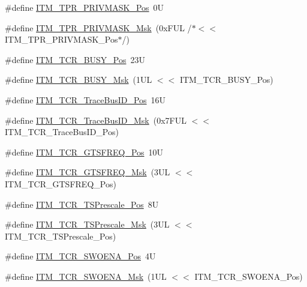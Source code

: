 \begin{DoxyCompactItemize}
\#define \hyperlink{group___c_m_s_i_s___i_t_m_ga7abe5e590d1611599df87a1884a352e8}{I\+T\+M\+\_\+\+T\+P\+R\+\_\+\+P\+R\+I\+V\+M\+A\+S\+K\+\_\+\+Pos}~0U
\item 
\#define \hyperlink{group___c_m_s_i_s___i_t_m_ga168e089d882df325a387aab3a802a46b}{I\+T\+M\+\_\+\+T\+P\+R\+\_\+\+P\+R\+I\+V\+M\+A\+S\+K\+\_\+\+Msk}~(0x\+F\+U\+L /$\ast$$<$$<$ I\+T\+M\+\_\+\+T\+P\+R\+\_\+\+P\+R\+I\+V\+M\+A\+S\+K\+\_\+\+Pos$\ast$/)
\item 
\#define \hyperlink{group___c_m_s_i_s___i_t_m_ga9174ad4a36052c377cef4e6aba2ed484}{I\+T\+M\+\_\+\+T\+C\+R\+\_\+\+B\+U\+S\+Y\+\_\+\+Pos}~23U
\item 
\#define \hyperlink{group___c_m_s_i_s___i_t_m_ga43ad7cf33de12f2ef3a412d4f354c60f}{I\+T\+M\+\_\+\+T\+C\+R\+\_\+\+B\+U\+S\+Y\+\_\+\+Msk}~(1\+U\+L $<$$<$ I\+T\+M\+\_\+\+T\+C\+R\+\_\+\+B\+U\+S\+Y\+\_\+\+Pos)
\item 
\#define \hyperlink{group___c_m_s_i_s___i_t_m_gaca0281de867f33114aac0636f7ce65d3}{I\+T\+M\+\_\+\+T\+C\+R\+\_\+\+Trace\+Bus\+I\+D\+\_\+\+Pos}~16U
\item 
\#define \hyperlink{group___c_m_s_i_s___i_t_m_ga60c20bd9649d1da5a2be8e656ba19a60}{I\+T\+M\+\_\+\+T\+C\+R\+\_\+\+Trace\+Bus\+I\+D\+\_\+\+Msk}~(0x7\+F\+U\+L $<$$<$ I\+T\+M\+\_\+\+T\+C\+R\+\_\+\+Trace\+Bus\+I\+D\+\_\+\+Pos)
\item 
\#define \hyperlink{group___c_m_s_i_s___i_t_m_ga96c7c7cbc0d98426c408090b41f583f1}{I\+T\+M\+\_\+\+T\+C\+R\+\_\+\+G\+T\+S\+F\+R\+E\+Q\+\_\+\+Pos}~10U
\item 
\#define \hyperlink{group___c_m_s_i_s___i_t_m_gade862cf009827f7f6748fc44c541b067}{I\+T\+M\+\_\+\+T\+C\+R\+\_\+\+G\+T\+S\+F\+R\+E\+Q\+\_\+\+Msk}~(3\+U\+L $<$$<$ I\+T\+M\+\_\+\+T\+C\+R\+\_\+\+G\+T\+S\+F\+R\+E\+Q\+\_\+\+Pos)
\item 
\#define \hyperlink{group___c_m_s_i_s___i_t_m_gad7bc9ee1732032c6e0de035f0978e473}{I\+T\+M\+\_\+\+T\+C\+R\+\_\+\+T\+S\+Prescale\+\_\+\+Pos}~8U
\item 
\#define \hyperlink{group___c_m_s_i_s___i_t_m_ga7a723f71bfb0204c264d8dbe8cc7ae52}{I\+T\+M\+\_\+\+T\+C\+R\+\_\+\+T\+S\+Prescale\+\_\+\+Msk}~(3\+U\+L $<$$<$ I\+T\+M\+\_\+\+T\+C\+R\+\_\+\+T\+S\+Prescale\+\_\+\+Pos)
\item 
\#define \hyperlink{group___c_m_s_i_s___i_t_m_ga7a380f0c8078f6560051406583ecd6a5}{I\+T\+M\+\_\+\+T\+C\+R\+\_\+\+S\+W\+O\+E\+N\+A\+\_\+\+Pos}~4U
\item 
\#define \hyperlink{group___c_m_s_i_s___i_t_m_ga97476cb65bab16a328b35f81fd02010a}{I\+T\+M\+\_\+\+T\+C\+R\+\_\+\+S\+W\+O\+E\+N\+A\+\_\+\+Msk}~(1\+U\+L $<$$<$ I\+T\+M\+\_\+\+T\+C\+R\+\_\+\+S\+W\+O\+E\+N\+A\+\_\+\+Pos)
$$
\end{DoxyCompactItemize}
